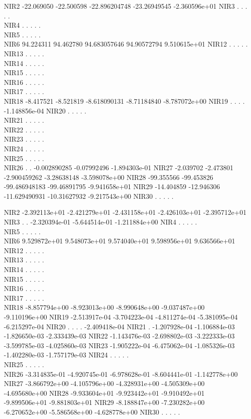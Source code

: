 \documentclass[
]{article}
\begin{document}
NIR2 -22.069050 -22.500598 -22.896204748 -23.26949545 -2.360596e+01 NIR3
. . . . .\\
NIR4 . . . . .\\
NIR5 . . . . .\\
NIR6 94.224311 94.462780 94.683057646 94.90572794 9.510615e+01 NIR12 . .
. . .\\
NIR13 . . . . .\\
NIR14 . . . . .\\
NIR15 . . . . .\\
NIR16 . . . . .\\
NIR17 . . . . .\\
NIR18 -8.417521 -8.521819 -8.618090131 -8.71184840 -8.787072e+00 NIR19 .
. . . -1.148856e-04 NIR20 . . . . .\\
NIR21 . . . . .\\
NIR22 . . . . .\\
NIR23 . . . . .\\
NIR24 . . . . .\\
NIR25 . . . . .\\
NIR26 . . -0.002890285 -0.07992496 -1.894303e-01 NIR27 -2.039702
-2.473801 -2.900459262 -3.28638148 -3.598078e+00 NIR28 -99.355566
-99.453826 -99.486948183 -99.46891795 -9.941658e+01 NIR29 -14.404859
-12.946306 -11.629490931 -10.31627932 -9.217543e+00 NIR30 . . . . .

NIR2 -2.392113e+01 -2.421279e+01 -2.431158e+01 -2.426103e+01
-2.395712e+01 NIR3 . . -2.320394e-01 -5.644514e-01 -1.211884e+00 NIR4 .
. . . .\\
NIR5 . . . . .\\
NIR6 9.529872e+01 9.548073e+01 9.574040e+01 9.598956e+01 9.636566e+01
NIR12 . . . . .\\
NIR13 . . . . .\\
NIR14 . . . . .\\
NIR15 . . . . .\\
NIR16 . . . . .\\
NIR17 . . . . .\\
NIR18 -8.857794e+00 -8.923013e+00 -8.990648e+00 -9.037487e+00
-9.110196e+00 NIR19 -2.513917e-04 -3.704223e-04 -4.811274e-04
-5.381095e-04 -6.215297e-04 NIR20 . . . . -2.409418e-04 NIR21 .
-1.207928e-04 -1.106884e-03 -1.826650e-03 -2.333439e-03 NIR22
-1.143476e-03 -2.698802e-03 -3.222333e-03 -3.599785e-03 -4.025860e-03
NIR23 -1.905222e-04 -6.475062e-04 -1.085326e-03 -1.402280e-03
-1.757179e-03 NIR24 . . . . .\\
NIR25 . . . . .\\
NIR26 -3.314835e-01 -4.920745e-01 -6.978628e-01 -8.604441e-01
-1.142778e+00 NIR27 -3.866792e+00 -4.105796e+00 -4.328931e+00
-4.505309e+00 -4.695680e+00 NIR28 -9.933604e+01 -9.923442e+01
-9.910492e+01 -9.899506e+01 -9.881803e+01 NIR29 -8.188847e+00
-7.230282e+00 -6.270652e+00 -5.586568e+00 -4.628778e+00 NIR30 . . . . .
\end{document}
